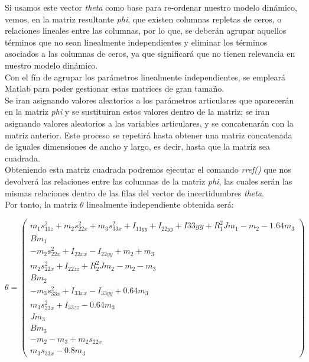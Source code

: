 		Si usamos este vector \textit{theta} como base para re-ordenar nuestro modelo dinámico, vemos, en la matriz resultante \textit{phi},
		que existen columnas repletas de ceros, o relaciones lineales entre las columnas, por lo que, se deberán
		agrupar aquellos términos que no sean linealmente independientes y eliminar los términos asociados
		a las columnas de ceros, ya que significará que no tienen relevancia en nuestro modelo dinámico.\\

		Con el fín de agrupar los parámetros linealmente independientes, se empleará Matlab para poder gestionar estas matrices de gran tamaño.\\
		Se iran asignando valores aleatorios a los parámetros articulares que aparecerán en la matriz \textit{phi} y se sustituiran estos valores dentro de la matriz; se iran asignando valores aleatorios a las variables articulares,  y se concatenarán
		con la matriz anterior. Este proceso se repetirá hasta obtener una matriz concatenada de iguales dimensiones de ancho y largo, es decir, hasta que la matriz sea cuadrada.\\

		Obteniendo esta matriz cuadrada podremos ejecutar el comando \textit{rref()} que nos devolverá las relaciones entre las columnas de la matriz \textit{phi}, las cuales serán las mismas relaciones dentro de las filas del vector de incertidumbres \textit{theta}.\\

Por tanto, la matriz $\theta$ linealmente independiente obtenida será:

\[
\theta=
\begin{pmatrix}
m_{1}s_{11z}^{2} + m_{2}s_{22x}^{2} + m_{3}s_{33x}^{2} + I_{11yy} + I_{22yy} + I{33yy} + R_{1}^{2}Jm_1 - m_2 - 1.64m_3 \\
Bm_{1}  \\
-m_{2}s_{22x}^{2} + I_{22xx} - I_{22yy} + m_{2} + m_{3} \\
m_{2}s_{22x}^{2} + I_{22zz} + R_{2}^{2}Jm_{2} - m_{2} - m_{3}  \\
Bm_{2} \\
- m_{3}s_{33x}^{2} + I_{33xx} - I_{33yy} + 0.64m_{3} \\
m_{3}s_{33x}^{2} + I_{33zz} - 0.64m_{3}  \\
Jm_{3}  \\
Bm_{3}  \\
-m_{2} -m_{3} + m_{2}s_{22x}  \\
m_{3}s_{33x} - 0.8m_{3}
\end{pmatrix}\]



